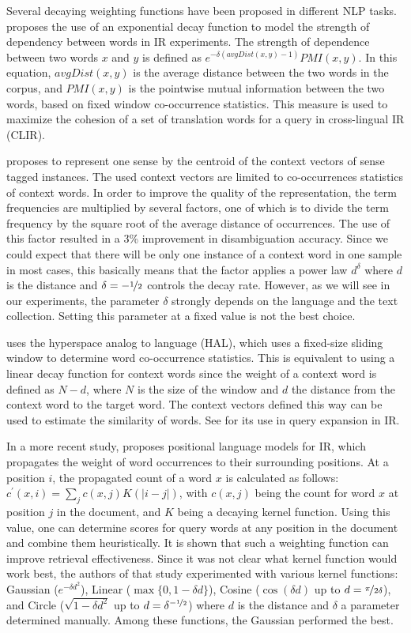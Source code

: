 \documentclass[english]{jnlp_1.4}
\begin{document}
Several decaying weighting functions have been proposed in different
NLP tasks. \cite{GaoDecayingWeight} proposes the use of an exponential
decay function to model the strength of dependency between words in
IR experiments. The strength of dependence between two words $x$
and $y$ is defined as $e^{-\delta(avgDist(x,y)-1)}PMI(x,y)$.
In this equation, $avgDist(x,y)$ is the average distance between
the two words in the corpus, and $PMI(x,y)$ is the pointwise mutual
information between the two words, based on fixed window co-occurrence
statistics. This measure is used to maximize the cohesion of a set
of translation words for a query in cross-lingual IR (CLIR).

\cite{OhChoiWsdStaticDynamicVector} proposes to represent one sense
by the centroid of the context vectors of sense tagged instances.
The used context vectors are limited to co-occurrences statistics
of context words. In order to improve the quality of the representation,
the term frequencies are multiplied by several factors, one of which
is to divide the term frequency by the square root of the average
distance of occurrences. The use of this factor resulted in a 3\%
improvement in disambiguation accuracy. Since we could expect that
there will be only one instance of a context word in one sample in
most cases, this basically means that the factor applies a power law
$d^{\delta}$ where $d$ is the distance and $\delta=-\nicefrac{1}{2}$
controls the decay rate. However, as we will see in our experiments,
the parameter $\delta$ strongly depends on the language and the text
collection. Setting this parameter at a fixed value is not the best
choice.

\cite{SongBruzaHAL} uses the hyperspace analog to language (HAL),
which uses a fixed-size sliding window to determine word co-occurrence
statistics. This is equivalent to using a linear decay function for
context words since the weight of a context word is defined as $N-d$,
where $N$ is the size of the window and $d$ the distance from the
context word to the target word. The context vectors defined this
way can be used to estimate the similarity of words. See \cite{BaiJingSong}
for its use in query expansion in IR.

In a more recent study, \cite{KernelDistanceIR} proposes positional
language models for IR, which propagates the weight of word occurrences
to their surrounding positions. At a position $i$, the propagated
count of a word $x$ is calculated as follows: $c^{\prime}(x,i)=\sum_{j}c(x,j)K(\left|i-j\right|)$,
with $c(x,j)$ being the count for word $x$ at position $j$ in the
document, and $K$ being a decaying kernel function. Using this value,
one can determine scores for query words at any position in the document
and combine them heuristically. It is shown that such a weighting
function can improve retrieval effectiveness. Since it was not clear
what kernel function would work best, the authors of that study experimented
with various kernel functions: Gaussian ($e^{-\delta d^{2}}$), Linear
($\max\{0,1-\delta d\}$), Cosine ($\cos(\delta d)$ up to $d=\nicefrac{\pi}{2\delta}$),
and Circle ($\sqrt{1-\delta d^{2}}$ up to $d=\delta^{-\nicefrac{1}{2}}$)
where $d$ is the distance and $\delta$ a parameter determined manually.
Among these functions, the Gaussian performed the best.
\end{document}

